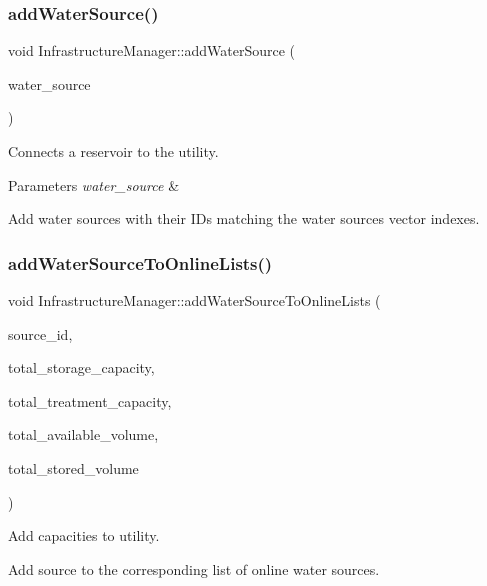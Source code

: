 \subsubsection{\texorpdfstring{add\+Water\+Source()}{addWaterSource()}}
{\footnotesize\ttfamily void Infrastructure\+Manager\+::add\+Water\+Source (\begin{DoxyParamCaption}\item[{\mbox{\hyperlink{classWaterSource}{Water\+Source}} $\ast$}]{water\+\_\+source }\end{DoxyParamCaption})}

Connects a reservoir to the utility. 
\begin{DoxyParams}{Parameters}
{\em water\+\_\+source} & \\
\hline
\end{DoxyParams}
Add water sources with their I\+Ds matching the water sources vector indexes. \mbox{\label{classInfrastructureManager_ab66bdc91a6f60c6aea6ce0bf179df913}} 
\subsubsection{\texorpdfstring{add\+Water\+Source\+To\+Online\+Lists()}{addWaterSourceToOnlineLists()}}
{\footnotesize\ttfamily void Infrastructure\+Manager\+::add\+Water\+Source\+To\+Online\+Lists (\begin{DoxyParamCaption}\item[{int}]{source\+\_\+id,  }\item[{double \&}]{total\+\_\+storage\+\_\+capacity,  }\item[{double \&}]{total\+\_\+treatment\+\_\+capacity,  }\item[{double \&}]{total\+\_\+available\+\_\+volume,  }\item[{double \&}]{total\+\_\+stored\+\_\+volume }\end{DoxyParamCaption})}

Add capacities to utility.

Add source to the corresponding list of online water sources. \mbox{\label{classInfrastructureManager_a7d60e4abff73890519ced487c74f2675}} 

